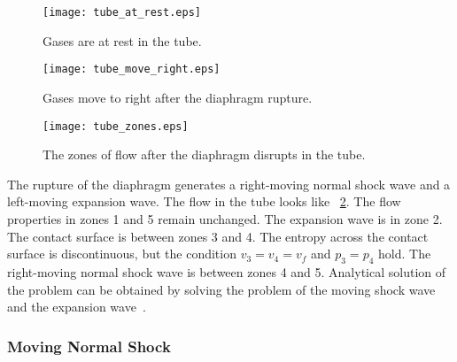 \documentclass{turgon}
\begin{document}
\begin{figure}[h]
  \centering
  \texttt{[image: tube\_at\_rest.eps]}
  \caption{Gases are at rest in the tube.}
  \label{f:tube_at_rest}
  \texttt{[image: tube\_move\_right.eps]}
  \caption{Gases move to right after the diaphragm rupture.}
  \label{f:tube_move_right}
\end{figure}

\begin{figure}[h]
  \centering
  \texttt{[image: tube\_zones.eps]}
  \caption{The zones of flow after the diaphragm disrupts in the tube.}
  \label{f:tube_zones}
\end{figure}

The rupture of the diaphragm generates a right-moving normal shock wave and a
left-moving expansion wave.
The flow in the tube looks like \figurename~\ref{f:tube_zones}.
The flow properties in zones 1 and 5 remain unchanged.
The expansion wave is in zone 2.
The contact surface is between zones 3 and 4.
The entropy across the contact surface is discontinuous, but the condition
$v_3 = v_4 = v_f$ and $p_3 = p_4$ hold.
The right-moving normal shock wave is between zones 4 and 5.
Analytical solution of the problem can be obtained by solving the problem of the
moving shock wave and the expansion wave~\citep{anderson_modern_2003}.

\subsubsection{Moving Normal Shock}
\end{document}
